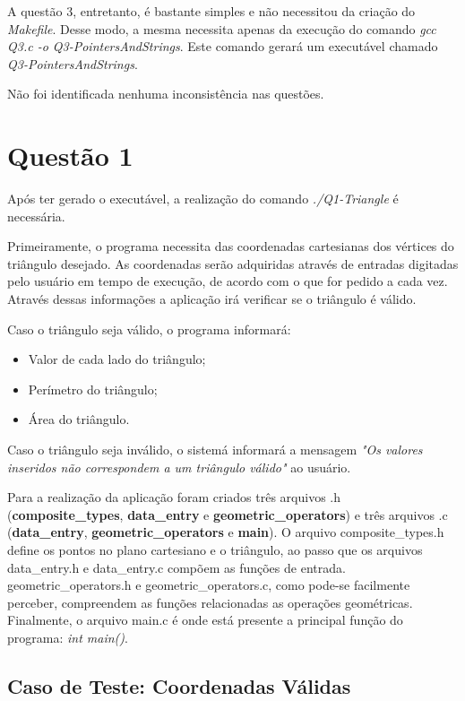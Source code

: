   A questão 3, entretanto, é bastante simples e não necessitou da criação do \textit{Makefile}. Desse modo, a mesma
  necessita apenas da execução do comando \textit{gcc Q3.c -o Q3-PointersAndStrings}. Este comando gerará um executável
  chamado \textit{Q3-PointersAndStrings}.

  Não foi identificada nenhuma inconsistência nas questões.

\section{Questão 1}

  Após ter gerado o executável, a realização do comando \textit{./Q1-Triangle} é necessária.

  Primeiramente, o programa necessita das coordenadas cartesianas dos vértices do triângulo desejado. As coordenadas
  serão adquiridas através de entradas digitadas pelo usuário em tempo de execução, de acordo com o que for pedido a
  cada vez. Através dessas informações a aplicação irá verificar se o triângulo é válido.

  Caso o triângulo seja válido, o programa informará:

  \begin{itemize}

    \item Valor de cada lado do triângulo;
    \item Perímetro do triângulo;
    \item Área do triângulo.

  \end{itemize}

  Caso o triângulo seja inválido, o sistemá informará a mensagem \textit{"Os valores inseridos não correspondem a um
  triângulo válido"} ao usuário.

  Para a realização da aplicação foram criados três arquivos .h (\textbf{composite\_types}, \textbf{data\_entry} e
  \textbf{geometric\_operators}) e três arquivos .c (\textbf{data\_entry}, \textbf{geometric\_operators} e
  \textbf{main}). O arquivo composite\_types.h define os pontos no plano cartesiano e o triângulo, ao passo que os
  arquivos data\_entry.h e data\_entry.c compõem as funções de entrada. geometric\_operators.h e geometric\_operators.c,
  como pode-se facilmente perceber, compreendem as funções relacionadas as operações geométricas. Finalmente, o arquivo
  main.c é onde está presente a principal função do programa: \textit{int main()}.

  \subsection{Caso de Teste: Coordenadas Válidas}

